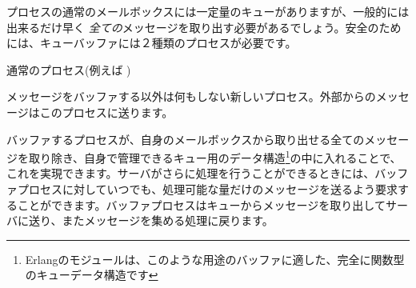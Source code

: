 プロセスの通常のメールボックスには一定量のキューがありますが、一般的には出来るだけ早く \emph{全ての}メッセージを取り出す必要があるでしょう。安全のためには、キューバッファには２種類のプロセスが必要です。


\begin{itemize*}
	\item 通常のプロセス(例えば )
	\item メッセージをバッファする以外は何もしない新しいプロセス。外部からのメッセージはこのプロセスに送ります。
\end{itemize*}

バッファするプロセスが、自身のメールボックスから取り出せる全てのメッセージを取り除き、自身で管理できるキュー用のデータ構造\footnote{Erlangのモジュールは、このような用途のバッファに適した、完全に関数型のキューデータ構造です}の中に入れることで、これを実現できます。サーバがさらに処理を行うことができるときには、バッファプロセスに対していつでも、処理可能な量だけのメッセージを送るよう要求することができます。バッファプロセスはキューからメッセージを取り出してサーバに送り、またメッセージを集める処理に戻ります。

